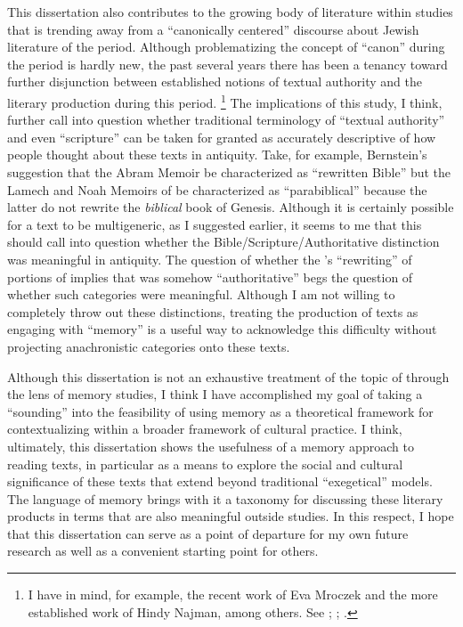 This dissertation also contributes to the growing body of literature within \secondtemple studies that is trending away from a ``canonically centered'' discourse about Jewish literature of the \secondtemple period. Although problematizing the concept of ``canon'' during the \secondtemple period is hardly new, the past several years there has been a tenancy toward further disjunction between established notions of textual authority and the literary production during this period.%
    \footnote{I have in mind, for example, the recent work of Eva Mroczek and the more established work of Hindy Najman, among others. See \cite{mroczek2016}; \cite{najman_jsj2012}; \cite{najman2003}.}
The implications of this study, I think, further call into question whether traditional terminology of ``textual authority'' and even ``scripture'' can be taken for granted as accurately descriptive of how people thought about these texts in antiquity. Take, for example, Bernstein's suggestion that the Abram Memoir be characterized as  ``rewritten Bible'' but the Lamech and Noah Memoirs of \ga be characterized as ``parabiblical'' because the latter do not rewrite the \emph{biblical} book of Genesis. Although it is certainly possible for a text to be multigeneric, as I suggested earlier, it seems to me that this should call into question whether the Bible/Scripture/Authoritative distinction was meaningful in antiquity. The question of whether the \ga's ``rewriting'' of portions of \firstenoch implies that \firstenoch was somehow ``authoritative'' begs the question of whether such categories were meaningful. Although I am not willing to completely throw out these distinctions, treating the production of \rwb texts as engaging with ``memory'' is a useful way to acknowledge this difficulty without projecting anachronistic categories onto these texts.


Although this dissertation is not an exhaustive treatment of the topic of \rwb through the lens of memory studies, I think I have accomplished my goal of taking a ``sounding'' into the feasibility of using memory as a theoretical framework for contextualizing \rwb within a broader framework of cultural practice. I think, ultimately, this dissertation shows the usefulness of a memory approach to reading \rwb texts, in particular as a means to explore the social and cultural significance of these texts that extend beyond traditional ``exegetical'' models. The language of memory  brings with it a taxonomy for discussing these literary products in terms that are also meaningful outside \secondtemple studies. In this respect, I hope that this dissertation can serve as a point of departure for my own future research as well as a convenient starting point for others. 
